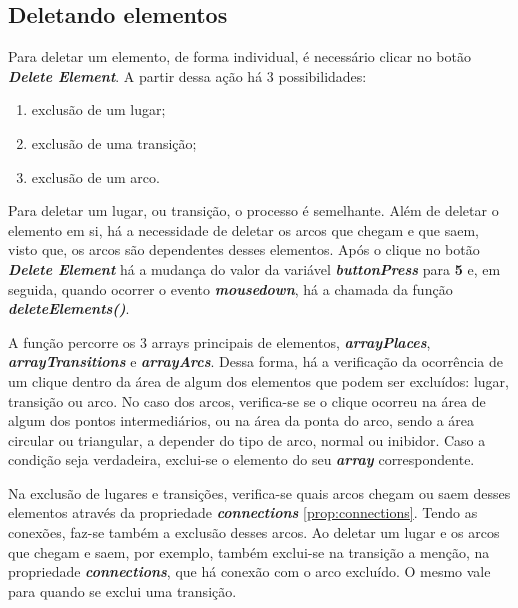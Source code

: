 \documentclass[
	12pt,				%
	openright,			%
	oneside,			%
	a4paper,			%
	english,			%
	brazil				%
	]{abntex2}
\begin{document}
\subsection*{Deletando elementos}

Para deletar um elemento, de forma individual, é necessário clicar no botão \textbf{\textit{Delete Element}}. A partir dessa ação há 3 possibilidades: 

\begin{enumerate}
	\item exclusão de um lugar;
	\item exclusão de uma transição;
	\item exclusão de um arco.
\end{enumerate}

Para deletar um lugar, ou transição, o processo é semelhante. Além de deletar o elemento em si, há a necessidade de deletar os arcos que chegam e que saem, visto que, os arcos são dependentes desses elementos. Após o clique no botão \textbf{\textit{Delete Element}} há a mudança do valor da variável \textbf{\textit{buttonPress}} para \textbf{5} e, em seguida, quando ocorrer o evento \textbf{\textit{mousedown}}, há a chamada da função \textbf{\textit{deleteElements()}}. 

A função percorre os 3 arrays principais de elementos, \textbf{\textit{arrayPlaces}}, \textbf{\textit{arrayTransitions}} e \textbf{\textit{arrayArcs}}. Dessa forma, há a verificação da ocorrência de um clique dentro da área de algum dos elementos que podem ser excluídos: lugar, transição ou arco. No caso dos arcos, verifica-se se o clique ocorreu na área de algum dos pontos intermediários, ou na área da ponta do arco, sendo a área circular ou triangular, a depender do tipo de arco, normal ou inibidor. Caso a condição seja verdadeira, exclui-se o elemento do seu \textbf{\textit{array}} correspondente.



Na exclusão de lugares e transições, verifica-se quais arcos chegam ou saem desses elementos através da propriedade \textbf{\textit{connections}} \ref{prop:connections}. Tendo as conexões, faz-se também a exclusão desses arcos. Ao deletar um lugar e os arcos que chegam e saem, por exemplo, também exclui-se na transição a menção, na propriedade \textbf{\textit{connections}}, que há conexão com o arco excluído. O mesmo vale para quando se exclui uma transição. 
\end{document}
